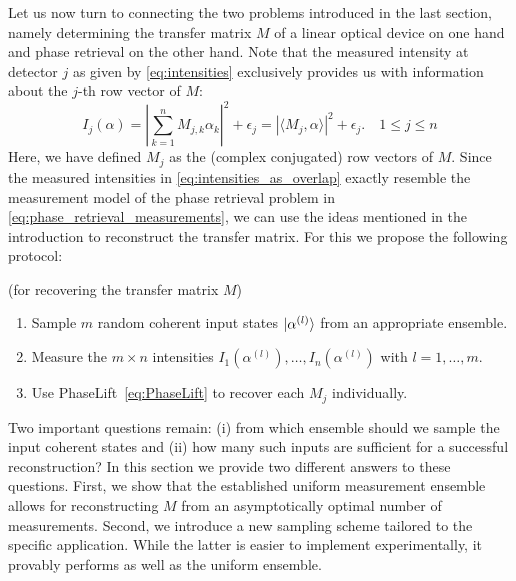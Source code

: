 Let us now turn to connecting the two problems introduced in the last section, namely determining the transfer matrix ${M}$ of a linear optical device on one hand and phase retrieval on the other hand.
Note that the measured intensity at detector $j$ as given by \cref{eq:intensities} exclusively provides us with information about the $j$-th row vector of ${M}$:
\begin{equation}
  I_j({\alpha})
  = \left| \sum_{k=1}^n M_{j,k} \alpha_k \right|^2 + \epsilon_j
  = \left\vert  \langle {M}_j, \alpha \rangle  \right\vert^2 + \epsilon_j. \quad 1 \leq j \leq n
  \label{eq:intensities_as_overlap}
\end{equation}
Here, we have defined ${M}_j$ as the (complex conjugated) row vectors of ${M}$.
Since the measured intensities in \cref{eq:intensities_as_overlap} exactly resemble the measurement model of the phase retrieval problem in \cref{eq:phase_retrieval_measurements}, we can use the ideas mentioned in the introduction to reconstruct the transfer matrix.
For this we propose the following protocol:
\begin{protocol}{(for recovering the transfer matrix $ M$)}%
  \label{prot:characterization}
  \begin{enumerate}
    \item Sample $m$ random coherent input states $\ket{ \alpha^{(l)}}$ from an appropriate ensemble.
    \item Measure the $m \times n$ intensities $I_1(\alpha^{(l)}), \ldots, I_n ( \alpha^{(l)})$ with $l=1,\ldots,m$.
    \item Use PhaseLift~\eqref{eq:PhaseLift} to recover each ${M}_j$ individually.
  \end{enumerate}
\end{protocol}
Two important questions remain:
(i) from which ensemble should we sample the input coherent states and (ii) how many such inputs are sufficient for a successful reconstruction?
In this section we provide two different answers to these questions.
First, we show that the established uniform measurement ensemble~\cite{kueng_low_2014} allows for reconstructing $ M$ from an asymptotically optimal number of measurements.
Second, we introduce a new sampling scheme tailored to the specific application.
While the latter is easier to implement experimentally, it provably performs as well as the uniform ensemble.

